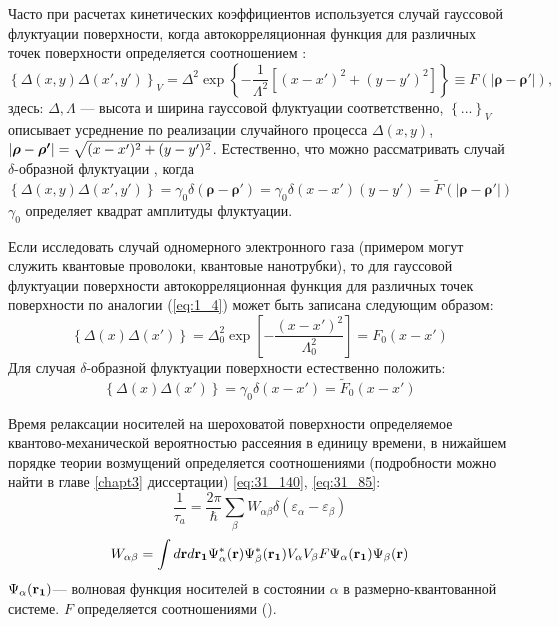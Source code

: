 Часто при расчетах кинетических коэффициентов используется случай гауссовой флуктуации поверхности, когда автокорреляционная функция для различных точек поверхности определяется соотношением \cite{Sakaki1987,Shchurova2009,Pozdnyakov2006,Khanh2016,Gold1987,Thongnum2008,Su2013}:
\begin{equation}
\label{eq:1_4}
\left\{ \Delta(x,y)\Delta(x',y') \right\}_V = \Delta^2 \exp \left\lbrace - \frac{1}{\Lambda^2} \left[ (x-x')^2 +(y-y')^2 \right] \right\rbrace \equiv F \left( \left| \boldsymbol{\rho} - \boldsymbol{\rho'} \right| \right),
\end{equation}
здесь:
$\Delta, \Lambda$ --- высота и ширина гауссовой флуктуации соответственно, 
$\left\{ ... \right\}_V$
описывает усреднение по реализации случайного процесса 
$\Delta(x,y)$, $\left| \boldsymbol{\mathbf{\rho}} - \boldsymbol{\mathbf{\rho'}} \right| = \sqrt{(x-x')^2 + (y-y')^2}$.
Естественно, что можно рассматривать случай $\delta$-образной флуктуации \cite{Lozovik1998}, когда
\begin{equation}
\label{eq:1_5}
\left\{ \Delta(x,y)\Delta(x',y') \right\} = \gamma_0\delta\left( \boldsymbol{\rho} - \boldsymbol{\rho'} \right) = \gamma_0\delta(x-x')(y-y')=\tilde{F} \left(\left| \boldsymbol{\rho} - \boldsymbol{\rho'} \right|\right)
\end{equation}
$\gamma_0$ определяет квадрат амплитуды флуктуации.

Если исследовать случай одномерного электронного газа (примером могут служить квантовые проволоки, квантовые нанотрубки), то для гауссовой флуктуации поверхности автокорреляционная функция для различных точек поверхности по аналогии (\ref{eq:1_4}) может быть записана следующим образом:
\begin{equation}
\label{eq:1_6}
\left\{\Delta(x)\Delta(x')\right\}=\Delta^2_0 \exp \left[-\frac{(x-x')^2}{\Lambda^2_0}\right] = F_0(x-x')
\end{equation}
Для случая $\delta$-образной флуктуации поверхности естественно положить:
\begin{equation}
\label{eq:1_7}
\left\{\Delta(x)\Delta(x')\right\}= \gamma_0 \delta(x-x') = \tilde{F}_0(x-x')
\end{equation}

Время релаксации носителей на шероховатой поверхности определяемое квантово-механической вероятностью рассеяния в единицу времени, в нижайшем порядке теории возмущений определяется соотношениями (подробности можно найти в главе \ref{chapt3} диссертации) \eqref{eq:31_140}, \eqref{eq:31_85}:
\begin{equation} \label{eq:1_8}
\frac{1}{\tau_a}=\frac{2\pi}{\hbar} \sum_\beta{W_{\alpha\beta}\delta\left(\varepsilon_\alpha-\varepsilon_\beta\right)}
\end{equation}
\begin{equation} \label{eq:1_8_5}
W_{\alpha\beta}=\int{d\boldsymbol{\mathbf{r}} d\boldsymbol{\mathbf{r_1}} \Psi^*_\alpha(\boldsymbol{\mathbf{r}}) \Psi^*_\beta(\boldsymbol{\mathbf{r_1}}) V_\alpha V_\beta F \Psi_\alpha(\boldsymbol{\mathbf{r_1}}) \Psi_\beta(\boldsymbol{\mathbf{r}})}
\end{equation}
$\Psi_\alpha(\boldsymbol{\mathbf{r_1}})$--- волновая функция носителей в состоянии $\alpha$ в размерно-квантованной системе. $F$ определяется соотношениями ().

